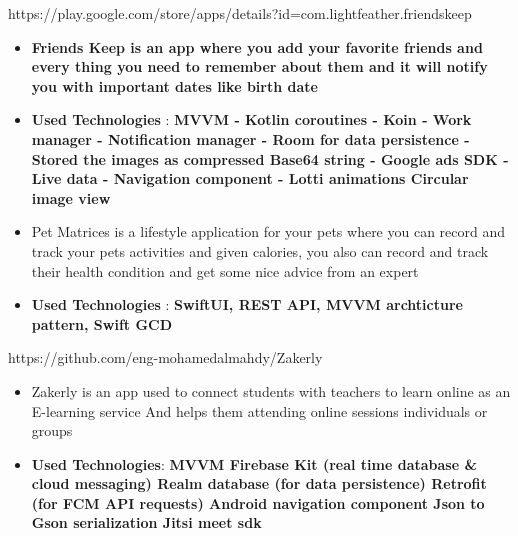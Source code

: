\documentclass[10pt,a4paper,ragged2e,withhyper]{altacv}
\begin{document}
\begin{paracol}{1}
        {\cvrepo{|\faGithub\faAndroid\faGooglePlay}
        {https://play.google.com/store/apps/details?id=com.lightfeather.friendskeep}}{}{}
        \begin{itemize}
            \item \textbf{Friends Keep is an app where you add your favorite friends and every thing you need to remember about them and it will notify you with important dates like birth date}
            \item \textbf{Used Technologies} : \textbf{MVVM -
            Kotlin coroutines -
            Koin -
            Work manager -
            Notification manager -
            Room for data persistence -
            Stored the images as compressed Base64 string -
            Google ads SDK -
            Live data -
            Navigation component -
            Lotti animations
            Circular image view}
        \end{itemize}
        \divider

        {\cvrepo{|\faLock\faApple}
        {}}{}{}
        \begin{itemize}
            \item \textbf{}Pet Matrices is a lifestyle application for your pets where you can record and track your pets activities and given calories, you also can record and track their health condition and get some nice advice from an expert
            \item \textbf{Used Technologies} : \textbf{SwiftUI, REST API, MVVM archticture pattern, Swift GCD}
        \end{itemize}
        \divider
        {\cvrepo{|\faGithub\faAndroid}
        {https://github.com/eng-mohamedalmahdy/Zakerly}}{}{}
        \begin{itemize}
            \item \textbf{}Zakerly is an app used to connect students with teachers to learn online as an E-learning service And helps them attending online sessions individuals or groups
            \item \textbf{Used Technologies}: \textbf{MVVM
            Firebase Kit (real time database \& cloud messaging)
                Realm database (for data persistence)
                Retrofit (for FCM API requests)
                Android navigation component
                Json to Gson serialization
                Jitsi meet sdk}
        \end{itemize}
        \divider


\end{paracol}
\end{document}
